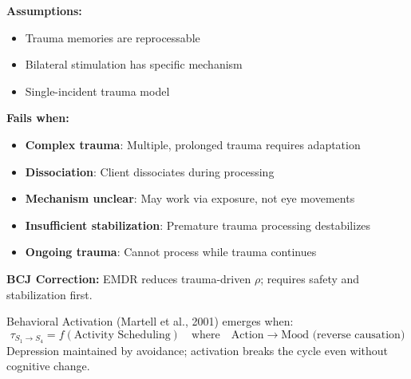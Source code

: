 \begin{tcolorbox}[colback=red!5!white, colframe=red!75!black, title=Boundary Condition: Where EMDR Fails]
\textbf{Assumptions:}
\begin{itemize}[nosep]
\item Trauma memories are reprocessable
\item Bilateral stimulation has specific mechanism
\item Single-incident trauma model
\end{itemize}

\textbf{Fails when:}
\begin{itemize}[nosep]
\item \textbf{Complex trauma}: Multiple, prolonged trauma requires adaptation
\item \textbf{Dissociation}: Client dissociates during processing
\item \textbf{Mechanism unclear}: May work via exposure, not eye movements
\item \textbf{Insufficient stabilization}: Premature trauma processing destabilizes
\item \textbf{Ongoing trauma}: Cannot process while trauma continues
\end{itemize}

\textbf{BCJ Correction:} EMDR reduces trauma-driven $\rho$; requires safety and stabilization first.
\end{tcolorbox}


\begin{theorem}
\label{thm:behavioral-activation}
Behavioral Activation (Martell et al., 2001) emerges when:
\begin{equation}
\boxed{\tau_{S_1 \to S_4} = f(\text{Activity Scheduling}) \quad \text{where} \quad \text{Action} \to \text{Mood} \text{ (reverse causation)}}
\end{equation}
Depression maintained by avoidance; activation breaks the cycle even without cognitive change.
\end{theorem}

